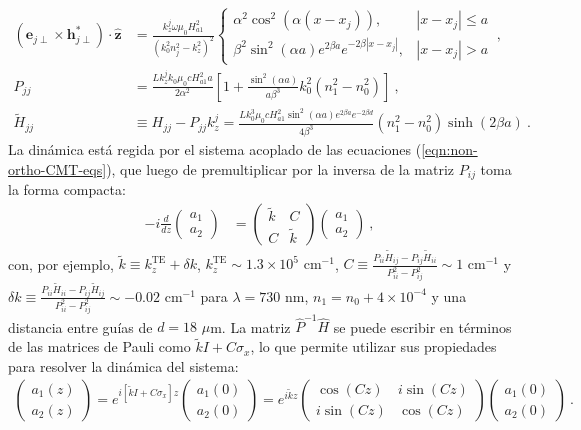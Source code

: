 \begin{align*}
	\left(\textbf{e}_{j\perp}\times\textbf{h}_{j\perp}^*\right)\cdot \hat{\textbf{z}}&=\frac{k_z^j\omega\mu_0 H_{a1}^2}{(k_0^2n_j^2-k_z^2)^2} \left\{ \begin{matrix}
\alpha^2\cos^2(\alpha (x-x_j)), & |x-x_j| \le a
\\
\beta^2 \sin^2(\alpha a) e^{2\beta a} e^{-2\beta|x-x_j|}, & |x-x_j|>a
\end{matrix}\right. \ ,
\\
	P_{jj} &= \frac{L k_z^j  k_0 \mu_0 c H_{a1}^2  a}{2 \alpha^2} \left[1 + \frac{\sin^2(\alpha a)}{a \beta^3 } k_0^2 \left( n_1^2 - n_0^2 \right) \right] \ ,
\\
	\tilde{H}_{jj} &\equiv H_{jj} - P_{jj} k_z^j =
	\frac{L k_0^3  \mu_0 c H_{a1}^2 \sin^2(\alpha a)e^{2\beta a}e^{-2\beta d}}{4 \beta^3 } (n_1^2-n_0^2) \sinh(2\beta a) \ .
\end{align*}
La dinámica está regida por el sistema acoplado de las ecuaciones (\ref{eqn:non-ortho-CMT-eqs}), que luego de premultiplicar por la inversa de la matriz $P_{ij}$ toma la forma compacta:
\begin{align*}
	-i\frac{d}{dz}\begin{pmatrix}
	a_1
	\\
	a_2
	\end{pmatrix} &= 	
	\begin{pmatrix}
	\tilde{k} & C
	\\
	C & \tilde{k}
	\end{pmatrix}
	\begin{pmatrix}
	a_1
	\\
	a_2
	\end{pmatrix} \ ,
\end{align*}
con, por ejemplo, $\tilde{k}\equiv k_z^{\text{TE}} + \delta k$, $k_z^{\text{TE}} \sim 1.3\times10^5 \text{ cm}^{-1}$, $C\equiv \frac{P_{ii} \tilde{H}_{ij}  -P_{ij}\tilde{H}_{ii}}{P_{ii}^2-P_{ij}^2} \sim 1\text{ cm}^{-1}$ y $\delta k \equiv \frac{P_{ii} \tilde{H}_{ii} -P_{ij}\tilde{H}_{ij}}{P_{ii}^2-P_{ij}^2} \sim -0.02\text{ cm}^{-1}$ para $\lambda = 730$ nm, $n_1 = n_0 + 4\times10^{-4}$ y una distancia entre guías de $d = 18 $ $\mu$m. La matriz $\hat{P}^{-1}\hat{H}$ se puede escribir en términos de las matrices de Pauli como $\tilde{k}I + C\sigma_x $, lo que permite utilizar sus propiedades para resolver la dinámica del sistema:
\begin{align*}
	\begin{pmatrix}
	a_1(z)
	\\
	a_2(z)
	\end{pmatrix}
	=
	e^{{i\left[\tilde{k}I + C\sigma_x\right]z }}	\begin{pmatrix}
	a_1(0)
	\\
	a_2(0)
	\end{pmatrix}
	=
	e^{i\tilde{k}z}
	\begin{pmatrix}
	\cos(Cz) & i\sin(Cz)
	\\
	i\sin(Cz) & \cos(Cz)
	\end{pmatrix}
	\begin{pmatrix}
	a_1(0)
	\\
	a_2(0)
	\end{pmatrix} \ .
\end{align*}
